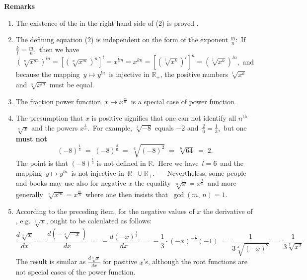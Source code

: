 \documentclass[12pt]{article}
\theoremstyle{definition}
\begin{document}
\textbf{Remarks}
\begin{enumerate}

\item The existence of the  in the right 
hand side of (2) is proved 
.

\item The defining equation (2) is independent on the form of the exponent $\frac{m}{n}$:\, If\, $\frac{k}{l} = \frac{m}{n}$,\, then we have\, $(\sqrt[n]{x^m})^{ln} = [(\sqrt[n]{x^m})^n]^l = x^{lm} = x^{kn} = 
[(\sqrt[l]{x^k})^l]^n = (\sqrt[l]{x^k})^{ln}$,\, and because the mapping\, 
$y\mapsto y^{ln}$\, is injective in $\mathbb{R}_+$, the positive numbers $\sqrt[l]{x^k}$ and $\sqrt[n]{x^m}$ must be equal.

\item The fraction power function\, $x\mapsto x^{\frac{m}{n}}$\, is a special case of power function.

\item The presumption that $x$ is positive signifies that one can not identify all $n^\mathrm{th}$  $\sqrt[n]{x}$ and the powers $x^{\frac{1}{n}}$.\, For example, $\sqrt[3]{-8}$ equals $-2$ and\, 
$\frac{2}{6} = \frac{1}{3}$,\, but one \textbf{must not} 
 $$(-8)^{\frac{1}{3}} \;=\; (-8)^{\frac{2}{6}} \;=\; \sqrt[6]{(-8)^2} \;=\; \sqrt[6]{64} \;=\; 2.$$
The point is that $(-8)^{\frac{1}{3}}$ is not defined in $\mathbb{R}$.\, Here we have\, $l = 6$\, and the mapping\, 
$y\mapsto y^{ln}$\, is not injective in\, $\mathbb{R}_-\cup\mathbb{R}_+$.\,
 --- Nevertheless, some people and books may use also for negative $x$ the equality\, $\sqrt[n]{x} = x^{\frac{1}{n}}$\, and more generally\, $\sqrt[n]{x^m} = x^{\frac{m}{n}}$\, where one then insists that\, $\gcd(m,\,n) = 1.$

\item According to the preceding item, for the negative values of $x$ the derivative of , e.g. $\sqrt[3]{x}$, ought to be calculated as follows:
$$\frac{d\sqrt[3]{x}}{dx} \;=\; \frac{d(-\sqrt[3]{-x})}{dx} 
\;=\; -\frac{d(-x)^\frac{1}{3}}{dx} \;=\; -\frac{1}{3}\!\cdot\!(-x)^{-\frac{2}{3}}(-1) 
\;=\;\frac{1}{3\sqrt[3]{(-x)^2}} \;=\; \frac{1}{3\sqrt[3]{x^2}}$$
The result is similar as $\frac{d\sqrt[3]{x}}{dx}$ for positive $x$'s, although the  root functions are not special cases of the power function.
\end{enumerate}
\end{document}
